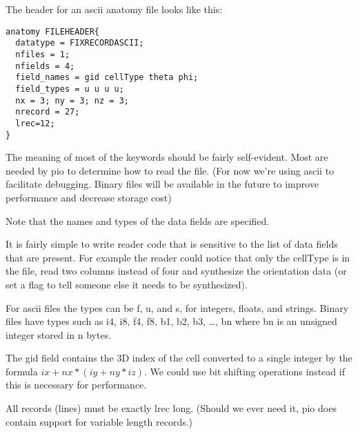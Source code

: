 \documentclass{article}
\begin{document}
The header for an ascii anatomy file looks like this:
\begin{verbatim}
anatomy FILEHEADER{
  datatype = FIXRECORDASCII;
  nfiles = 1;
  nfields = 4;
  field_names = gid cellType theta phi;
  field_types = u u u u;
  nx = 3; ny = 3; nz = 3;
  nrecord = 27;
  lrec=12;
}
\end{verbatim}
The meaning of most of the keywords should be fairly self-evident.  Most
are needed by pio to determine how to read the file.   (For now we're
using ascii to facilitate debugging.  Binary files will be available in
the future to improve performance and decrease storage cost)


Note that the names and types of the data fields are specified.  

It is fairly simple to write reader code that is sensitive to the list
of data fields that are present.  For example the reader could notice
that only the cellType is in the file, read two columns instead of four
and synthesize the orientation data (or set a flag to tell someone else
it needs to be synthesized).

For ascii files the types can be f, u, and s, for integers, floats, and
strings.  Binary files have types such as i4, i8, f4, f8, b1, b2, b3, \ldots,
bn where bn is an unsigned integer stored in n bytes.

The gid field contains the 3D index of the cell converted to a single
integer by the formula $ix + nx*(iy + ny*iz)$.  We could use bit
shifting operations instead if this is necessary for performance.

All records (lines) must be exactly lrec long.  (Should we ever need it,
pio does contain support for variable length records.)
\end{document}
